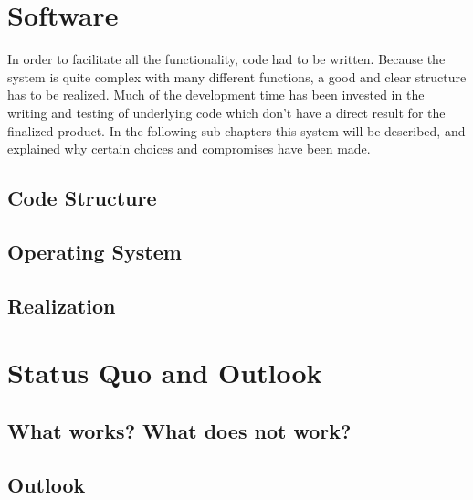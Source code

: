 \documentclass{report}
\begin{document}
\chapter{Software}
\label{chap:software}
In order to facilitate all the functionality, code had to be written. Because the system is quite complex with many different functions, a good and clear structure has to be realized. Much of the development time has been invested in the writing and testing of underlying code which don't have a direct result for the finalized product. In the following sub-chapters this system will be described, and explained why certain choices and compromises have been made.
\section{Code Structure} 
\label{sec:code_structure}

\section{Operating System}
\label{sec:os}

\section{Realization}
\label{sec:realization}


\chapter{Status Quo and Outlook}
\label{chap:status}
\section{What works? What does not work?}
\label{sec:what}

\section{Outlook}
\label{sec:outlook}


\clearpage
{}
\setcounter{page}{\value{roman}}
\pagestyle{empty}
\appendix


\end{document}
